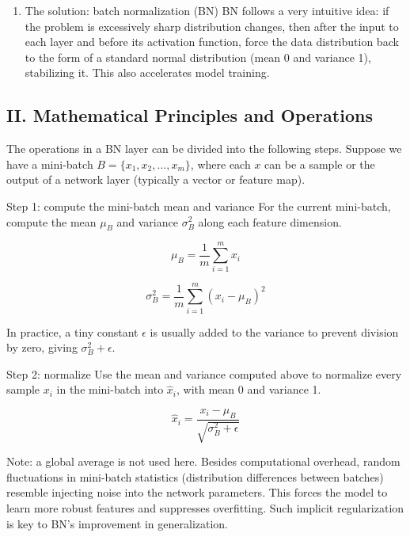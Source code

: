 \begin{enumerate}
\def\labelenumi{\arabic{enumi}.}
\setcounter{enumi}{1}
\tightlist
\item
  The solution: batch normalization (BN)
  BN follows a very intuitive idea: if the problem is excessively sharp distribution changes, then after the input to each layer and before its activation function, force the data distribution back to the form of a standard normal distribution (mean 0 and variance 1), stabilizing it. This also accelerates model training.
\end{enumerate}

\hypertarget{ii.-mathematical-principles-and-operations}{%
\subsection{II. Mathematical Principles and Operations}\label{ii.-mathematical-principles-and-operations}}

The operations in a BN layer can be divided into the following steps. Suppose we have a mini-batch \(B=\{x_1,x_2,\ldots,x_m\}\), where each \(x\) can be a sample or the output of a network layer (typically a vector or feature map).

Step 1: compute the mini-batch mean and variance
For the current mini-batch, compute the mean \(\mu_B\) and variance \(\sigma_B^2\) along each feature dimension.

\[
\mu_B=\frac{1}{m}\sum_{i=1}^{m}x_i
\]

\[
\sigma_B^2=\frac{1}{m}\sum_{i=1}^{m}(x_i-\mu_B)^2
\]

In practice, a tiny constant \(\epsilon\) is usually added to the variance to prevent division by zero, giving \(\sigma_B^2+\epsilon\).

Step 2: normalize
Use the mean and variance computed above to normalize every sample \(x_i\) in the mini-batch into \(\hat{x}_i\), with mean 0 and variance 1.

\[
\hat{x}_i=\frac{x_i-\mu_B}{\sqrt{\sigma_B^2+\epsilon}}
\]

Note: a global average is not used here. Besides computational overhead, random fluctuations in mini-batch statistics (distribution differences between batches) resemble injecting noise into the network parameters. This forces the model to learn more robust features and suppresses overfitting. Such implicit regularization is key to BN's improvement in generalization.

